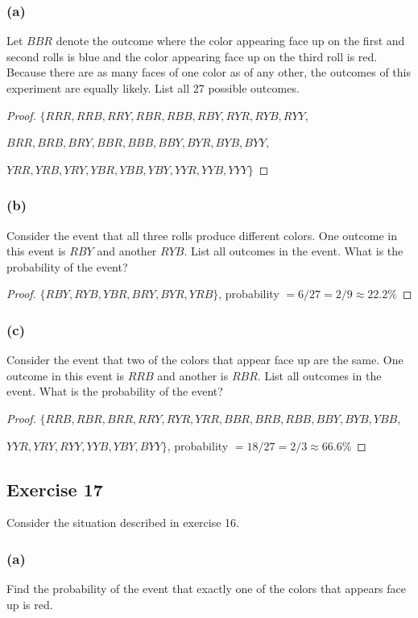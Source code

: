 \documentclass[14pt]{extarticle}
\begin{document}
\subsubsection{(a)}
Let \(BBR\) denote the outcome where the color appearing face up on the first and second rolls is blue and the color 
appearing face up on the third roll is red. Because there are as many faces of one color as of any other, the 
outcomes of this experiment are equally likely. List all 27 possible outcomes.

\begin{proof}
\(\{RRR, RRB, RRY, RBR, RBB, RBY, RYR, RYB, RYY,\) 

\(BRR, BRB, BRY, BBR, BBB, BBY, BYR, BYB, BYY,\)

\(YRR, YRB, YRY, YBR, YBB, YBY, YYR, YYB, YYY\}\)
\end{proof}

\subsubsection{(b)}
Consider the event that all three rolls produce different colors. One outcome in this event is \(RBY\) and another 
\(RYB\). List all outcomes in the event. What is the probability of the event?

\begin{proof}
\(\{RBY, RYB, YBR, BRY, BYR, YRB\}\), probability \(= 6/27 = 2/9 \approx 22.2\%\)
\end{proof}

\subsubsection{(c)}
Consider the event that two of the colors that appear face up are the same. One outcome in this event is \(RRB\) and 
another is \(RBR\). List all outcomes in the event. What is the probability of the event?

\begin{proof}
\(\{RRB, RBR, BRR, RRY, RYR, YRR, BBR, BRB, RBB, BBY, BYB, YBB,\)

\(YYR, YRY, RYY, YYB, YBY, BYY\}\), probability \(= 18/27 = 2/3 \approx 66.6\%\)
\end{proof}

\subsection{Exercise 17}
Consider the situation described in exercise 16.

\subsubsection{(a)}
Find the probability of the event that exactly one of the colors that appears face up is red.
\end{document}

